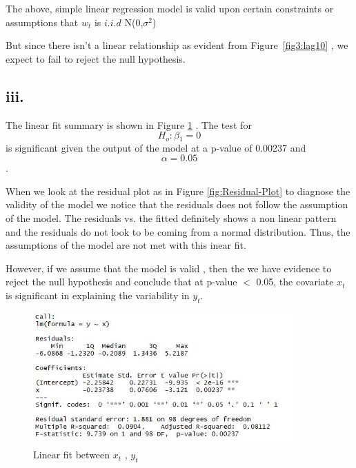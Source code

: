 \documentclass{article}
\begin{document}
The above, simple linear regression model is valid upon certain constraints or assumptions that $w_t$ is $i.i.d$ N(0,$\sigma^2$)

But since there isn't a linear relationship as evident from Figure~\ref{fig3:lag10} , we expect to fail to reject the null hypothesis.

\subsection{iii.}

The linear fit summary is shown in Figure \ref{fig4:fit} . The test for \[  H_o : \beta{_1} = 0  \] is significant given the output of the model at a p-value of 0.00237 and \[ \alpha = 0.05 \] . 

When we look at the residual plot as in Figure \ref{fig:Residual-Plot} to diagnose the validity of the model we notice that  
the residuals does not follow the assumption of the model. The residuals vs. the fitted definitely shows a non linear pattern and the residuals do not look to be coming from a normal distribution. Thus, the assumptions of the model are not met with this inear fit.

However, if we assume that the model is valid , then the we have evidence to reject the null hypothesis and conclude that 
at p-value $<$ 0.05, the covariate $x_t$ is significant in explaining the variability in $y_t$.
\begin{figure}
	\centering
	\includegraphics[width=0.9\textwidth]{Fit}
	\caption{Linear fit between $x_t$ , $y_t$ }
    \label{fig4:fit}
\end{figure}
\end{document}
